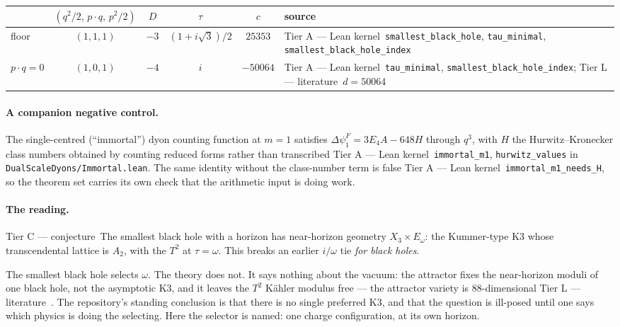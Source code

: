 \documentclass[11pt,a4paper]{article}
\theoremstyle{remark}
\newcommand{\tierA}{\colorbox{green!15}{\textsf{\scriptsize Tier A --- Lean kernel}}}
\newcommand{\tierL}{\colorbox{blue!10}{\textsf{\scriptsize Tier L --- literature}}}
\newcommand{\tierC}{\colorbox{orange!15}{\textsf{\scriptsize Tier C --- conjecture}}}
\newcommand{\lean}[1]{\texttt{#1}}
\begin{document}
\begin{center}
\begin{tabular}{lccccl}
\hline
 & $(q^2/2,\,p\cdot q,\,p^2/2)$ & $D$ & $\tau$ & $c$ & source \\
\hline
floor & $(1,1,1)$ & $-3$ & $(1+i\sqrt3)/2$ & $25353$ & \tierA\ \lean{smallest\_black\_hole}, \lean{tau\_minimal}, \lean{smallest\_black\_hole\_index} \\
$p\cdot q=0$ & $(1,0,1)$ & $-4$ & $i$ & $-50064$ & \tierA\ \lean{tau\_minimal}, \lean{smallest\_black\_hole\_index}; \tierL\ $d=50064$ \cite{Sen2007} \\
\hline
\end{tabular}
\end{center}

\paragraph{A companion negative control.} The single-centred (``immortal'') dyon counting function at $m=1$ satisfies $\Delta\psi_1^F=3E_4A-648H$ through $q^3$, with $H$ the Hurwitz--Kronecker class numbers obtained by counting reduced forms rather than transcribed \tierA\ \lean{immortal\_m1}, \lean{hurwitz\_values} in \lean{DualScaleDyons/Immortal.lean}. The same identity without the class-number term is false \tierA\ \lean{immortal\_m1\_needs\_H}, so the theorem set carries its own check that the arithmetic input is doing work.

\paragraph{The reading.} \tierC\ The smallest black hole with a horizon has near-horizon geometry $X_3\times E_\omega$: the Kummer-type K3 whose transcendental lattice is $A_2$, with the $T^2$ at $\tau=\omega$. This breaks an earlier $i/\omega$ tie \emph{for black holes}.

\begin{scopebox}
The smallest black hole selects $\omega$. The theory does not. It says nothing about the vacuum: the attractor fixes the near-horizon moduli of one black hole, not the asymptotic K3, and it leaves the $T^2$ K\"ahler modulus free --- the attractor variety is $88$-dimensional \tierL\ \cite[(4.3), ll.~1351--1353]{Moore1998}. The repository's standing conclusion is that there is no single preferred K3, and that the question is ill-posed until one says which physics is doing the selecting. Here the selector is named: one charge configuration, at its own horizon.
\end{scopebox}
\end{document}
